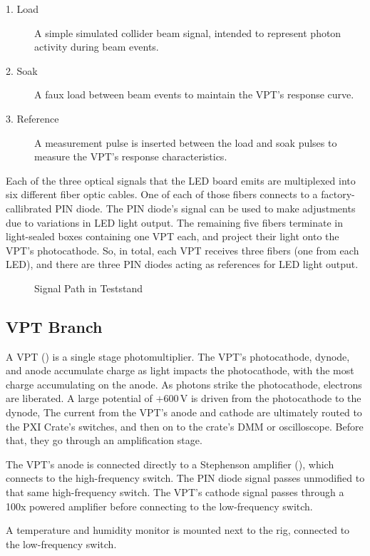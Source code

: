 \begin{description}
\item [1. Load] A simple simulated collider beam signal, intended to represent photon activity during beam events.
\item [2. Soak] A faux load between beam events to maintain the VPT's response curve.
\item [3. Reference] A measurement pulse is inserted between the load and soak pulses to measure the VPT's response characteristics.
\end{description}

Each of the three optical signals that the LED board emits are multiplexed into six different fiber optic cables.  One of each of those fibers connects to a factory-callibrated PIN diode.  The PIN diode's signal can be used to make adjustments due to variations in LED light output.  The remaining five fibers terminate in light-sealed boxes containing one VPT each, and project their light onto the VPT's photocathode.  So, in total, each VPT receives three fibers (one from each LED), and there are three PIN diodes acting as references for LED light output.

\begin{figure}[htbp]
  \centering
  
  \caption{Signal Path in Teststand}
  \label{fig:eq_intro:signal}
\end{figure}


\subsection{VPT Branch}
\label{sec:eq_intro:vpt_branch}
A VPT () is a single stage photomultiplier.  The VPT's photocathode, dynode, and anode accumulate charge as light impacts the photocathode, with the most charge accumulating on the anode.  As photons  strike the photocathode, electrons are liberated.  A large potential of $+600$\,V is driven from the photocathode to the dynode,   The current from the VPT's anode and cathode are ultimately routed to the PXI Crate's switches, and then on to the crate's DMM or oscilloscope.  Before that, they go through an amplification stage.

The VPT's anode is connected directly to a Stephenson amplifier (), which connects to the  high-frequency switch.  The PIN diode signal passes unmodified to that same  high-frequency switch.  The VPT's cathode signal passes through a \FIXME 100x powered amplifier before connecting to the  low-frequency switch.

A temperature and humidity monitor is mounted next to the rig, connected to the  low-frequency switch.


